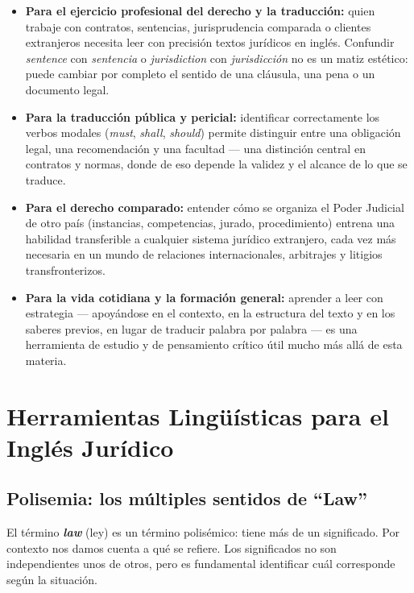 \documentclass[12pt,oneside]{book}
\begin{document}
\begin{itemize}
    \item \textbf{Para el ejercicio profesional del derecho y la traducción:} quien trabaje con contratos, sentencias, jurisprudencia comparada o clientes extranjeros necesita leer con precisión textos jurídicos en inglés. Confundir \textit{sentence} con \textit{sentencia} o \textit{jurisdiction} con \textit{jurisdicción} no es un matiz estético: puede cambiar por completo el sentido de una cláusula, una pena o un documento legal.
    
    \item \textbf{Para la traducción pública y pericial:} identificar correctamente los verbos modales (\textit{must}, \textit{shall}, \textit{should}) permite distinguir entre una obligación legal, una recomendación y una facultad --- una distinción central en contratos y normas, donde de eso depende la validez y el alcance de lo que se traduce.
    
    \item \textbf{Para el derecho comparado:} entender cómo se organiza el Poder Judicial de otro país (instancias, competencias, jurado, procedimiento) entrena una habilidad transferible a cualquier sistema jurídico extranjero, cada vez más necesaria en un mundo de relaciones internacionales, arbitrajes y litigios transfronterizos.
    
    \item \textbf{Para la vida cotidiana y la formación general:} aprender a leer con estrategia --- apoyándose en el contexto, en la estructura del texto y en los saberes previos, en lugar de traducir palabra por palabra --- es una herramienta de estudio y de pensamiento crítico útil mucho más allá de esta materia.
\end{itemize}

\newpage

\chapter{Herramientas Lingüísticas para el Inglés Jurídico}

\section{Polisemia: los múltiples sentidos de ``Law''}

El término \textbf{\textit{law}} (ley) es un término polisémico: tiene más de un significado. Por contexto nos damos cuenta a qué se refiere. Los significados no son independientes unos de otros, pero es fundamental identificar cuál corresponde según la situación.
\end{document}
